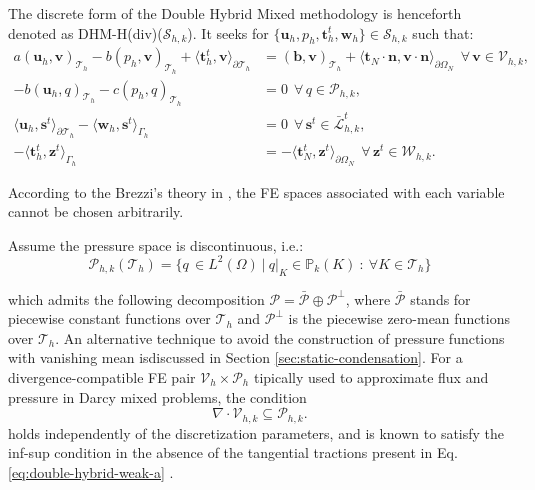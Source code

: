 \documentclass[english,11pt,3p,number,sort&compress]{elsarticle}
\begin{document}
The discrete form of the Double Hybrid Mixed methodology is henceforth denoted as DHM-H(div)($\mathcal{S}_{h,k}$). It seeks for $\{\bm{u}_h,p_h,\bm{t}^t_h,\bm{w}_h\} \in \mathcal{S}_{h,k}$ such that:
\begin{subequations} \label{eq:double-hybrid-discrete}
	\begin{align}
		a\left(\bm{u}_h,\bm{v}\right)_{\mathcal{T}_h} - b\left( p_h, \bm{v}\right)_{\mathcal{T}_h} +\langle\bm{t}^t_h,\bm{v}\rangle_{\partial\mathcal{T}_h} &= \left(\bm{b},\bm{v}\right)_{\mathcal{T}_h} + \langle\bm{t}_N\cdot\bm{n},\bm{v}\cdot\bm{n}\rangle_{\partial\Omega_N} ~~\forall\, \bm{v} \in \mathcal{V}_{h,k},\label{eq:double-hybrid-discrete-a}\\ 
		-b\left(\bm{u}_h, q\right)_{\mathcal{T}_h} - c\left(p_h,q \right)_{\mathcal{T}_h} &= 0 ~~\forall\, q \in \mathcal{P}_{h,k}, \label{eq:double-hybrid-discrete-b}\\
		\langle\bm{u}_h,\bm{s}^t\rangle_{\partial\mathcal{T}_h} - \langle\bm{w}_h,\bm{s}^t\rangle_{\Gamma_h} &= 0 ~~\forall\, \bm{s}^t \in \bar{\mathcal{L}}^t_{h,k}, \label{eq:double-hybrid-discrete-c}\\
		-\langle\bm{t}^t_h,\bm{z}^t\rangle_{\Gamma_h} &= -\langle\bm{t}_N^t,\bm{z}^t\rangle_{\partial\Omega_N} ~~\forall\, \bm{z}^t \in \mathcal{W}_{h,k}. \label{eq:double-hybrid-discrete-d}
	\end{align}
\end{subequations}

According to the Brezzi's theory in \cite{girault2012finite,brezzi2012mixed,arnold1988new}, the FE spaces associated with each variable cannot be chosen arbitrarily. 

Assume the pressure space is discontinuous, i.e.:
\begin{equation}
	\mathcal{P}_{h,k}(\mathcal{T}_h) = \{q \, \in L^2(\Omega) ~\lvert~ q\lvert_K \in \mathbb{P}_k(K) ~:~ \forall K \in \mathcal{T}_h\}
\end{equation}

\noindent which admits the following decomposition $\mathcal{P}=\bar{\mathcal{P}} \oplus \mathcal{P}^\perp$, where $\bar{\mathcal{P}}$ stands for piecewise constant functions over $\mathcal{T}_h$ and $\mathcal{P}^\perp$ is the piecewise zero-mean functions over $\mathcal{T}_h$. An alternative technique to avoid the construction of pressure functions with vanishing mean isdiscussed in Section \ref{sec:static-condensation}. For a divergence-compatible FE pair $\mathcal{V}_h \times \mathcal{P}_h$ tipically used to approximate flux and pressure in Darcy mixed problems, the condition
\begin{equation*}
	\nabla \cdot \mathcal{V}_{h,k} \subseteq \mathcal{P}_{h,k}.
\end{equation*}
holds independently of the discretization parameters, and is known to satisfy the inf-sup condition in the absence of the tangential tractions present in Eq. \eqref{eq:double-hybrid-weak-a} \cite{carvalho2024semi}.
\end{document}
